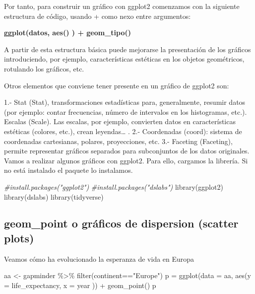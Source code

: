 \documentclass[
]{book}
\newenvironment{Shaded}{\begin{snugshade}}{\end{snugshade}}
\newcommand{\AttributeTok}[1]{\textcolor[rgb]{0.77,0.63,0.00}{#1}}
\newcommand{\CommentTok}[1]{\textcolor[rgb]{0.56,0.35,0.01}{\textit{#1}}}
\newcommand{\FunctionTok}[1]{\textcolor[rgb]{0.00,0.00,0.00}{#1}}
\newcommand{\NormalTok}[1]{#1}
\newcommand{\OtherTok}[1]{\textcolor[rgb]{0.56,0.35,0.01}{#1}}
\newcommand{\SpecialCharTok}[1]{\textcolor[rgb]{0.00,0.00,0.00}{#1}}
\newcommand{\StringTok}[1]{\textcolor[rgb]{0.31,0.60,0.02}{#1}}
\begin{document}
Por tanto, para construir un gráfico con ggplot2 comenzamos con la siguiente estructura de código, usando + como nexo entre argumentos:

\textbf{ggplot(datos, aes() ) + geom\_tipo()}

A partir de esta estructura básica puede mejorarse la presentación de los gráficos introduciendo, por ejemplo, características estéticas en los objetos geométricos, rotulando los gráficos, etc.

Otros elementos que conviene tener presente en un gráfico de ggplot2 son:

1.- Stat (Stat), transformaciones estadísticas para, generalmente, resumir datos (por ejemplo: contar frecuencias, número de intervalos en los histogramas, etc.).
Escalas (Scale). Las escalas, por ejemplo, convierten datos en características estéticas (colores, etc.), crean leyendas\ldots{} .
2.- Coordenadas (coord): sistema de coordenadas cartesianas, polares, proyecciones, etc.
3.- Faceting (Faceting), permite representar gráficos separados para subconjuntos de los datos originales.
Vamos a realizar algunos gráficos con ggplot2. Para ello, cargamos la librería. Si no está instalado el paquete lo instalamos.

\begin{Shaded}
\begin{Highlighting}[]
\CommentTok{\#install.packages("ggplot2")}
\CommentTok{\#install.packages("dslabs")}
\FunctionTok{library}\NormalTok{(ggplot2)}
\FunctionTok{library}\NormalTok{(dslabs)}
\FunctionTok{library}\NormalTok{(tidyverse)}
\end{Highlighting}
\end{Shaded}

\hypertarget{geom_point-o-gruxe1ficos-de-dispersion-scatter-plots}{%
\subsection{geom\_point o gráficos de dispersion (scatter plots)}\label{geom_point-o-gruxe1ficos-de-dispersion-scatter-plots}}

Veamos cómo ha evolucionado la esperanza de vida en Europa

\begin{Shaded}
\begin{Highlighting}[]
\NormalTok{aa }\OtherTok{\textless{}{-}}\NormalTok{ gapminder }\SpecialCharTok{\%\textgreater{}\%} \FunctionTok{filter}\NormalTok{(continent}\SpecialCharTok{==}\StringTok{"Europe"}\NormalTok{)}
\NormalTok{p }\OtherTok{=} \FunctionTok{ggplot}\NormalTok{(}\AttributeTok{data =}\NormalTok{ aa, }\FunctionTok{aes}\NormalTok{(}\AttributeTok{y =}\NormalTok{ life\_expectancy, }\AttributeTok{x =}\NormalTok{ year )) }\SpecialCharTok{+}
  \FunctionTok{geom\_point}\NormalTok{()}
\NormalTok{p}
\end{Highlighting}
\end{Shaded}
\end{document}
